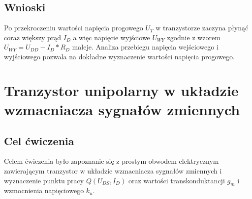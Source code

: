 \documentclass[11pt]{article}
\begin{document}
\subsection{Wnioski}
Po przekroczeniu wartości napięcia progowego $U_T$ w tranzystorze zaczyna płynąć coraz większy prąd $I_D$ a więc napięcie wyjściowe $U_{WY}$ zgodnie z wzorem $U_{WY} = U_{DD} - I_D*R_D$ maleje. Analiza przebiegu napięcia wejściowego
i wyjściowego pozwala na dokładne wyznaczenie wartości napięcia progowego.
\section{Tranzystor unipolarny w układzie wzmacniacza sygnałów zmiennych}
\subsection{Cel ćwiczenia}
Celem ćwiczenia było zapoznanie się z prostym obwodem elektrycznym zawierającym tranzystor w układzie wzmacniacza sygnałów zmiennych i wyznaczenie punktu pracy $Q(U_{DS},I_D)$ oraz wartości transkonduktancji $g_m$ i wzmocnienia
napięciowego $k_u$.
\end{document}

